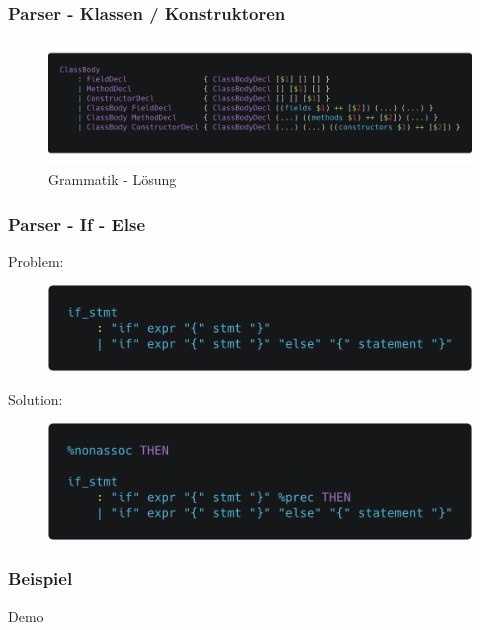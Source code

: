 \begin{frame}[fragile]
	\frametitle{Parser - Klassen / Konstruktoren}
	\begin{figure}[H]
		\centering
		\includegraphics[width=0.9\linewidth]{images/parser/full-class-ast.png}
		\caption{Grammatik - Lösung}
		\label{fig:images/parser/full-class-ast}
	\end{figure}
\end{frame}

\begin{frame}[fragile]
	\frametitle{Parser - If - Else}
	Problem:
	\begin{figure}[H]
		\centering
		\includegraphics[width=0.7\linewidth]{images/parser/if-else-grammar.png}
	\end{figure}
	\pause
	Solution:

	\begin{figure}[H]
		\centering
		\includegraphics[width=0.7\linewidth]{images/parser/sol-if-else-grammar.png}
	\end{figure}
\end{frame}

\begin{frame}[fragile]
	\frametitle{Beispiel}
	\begin{center}
		\Huge Demo
	\end{center}
\end{frame}


